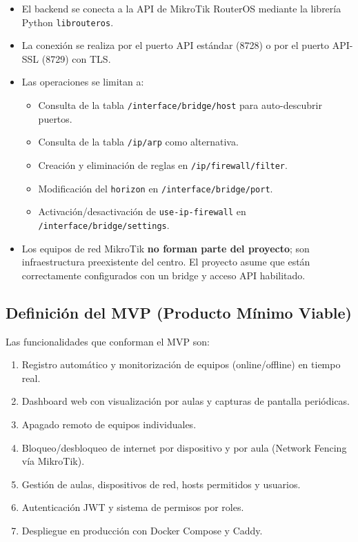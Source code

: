\documentclass[12pt, a4paper, twoside]{article}
\begin{document}
\begin{itemize}
  \item El backend se conecta a la API de MikroTik RouterOS mediante la librería Python \texttt{librouteros}.
  \item La conexión se realiza por el puerto API estándar (8728) o por el puerto API-SSL (8729) con TLS.
  \item Las operaciones se limitan a:
  \begin{itemize}
    \item Consulta de la tabla \texttt{/interface/bridge/host} para auto-descubrir puertos.
    \item Consulta de la tabla \texttt{/ip/arp} como alternativa.
    \item Creación y eliminación de reglas en \texttt{/ip/firewall/filter}.
    \item Modificación del \texttt{horizon} en \texttt{/interface/bridge/port}.
    \item Activación/desactivación de \texttt{use-ip-firewall} en \texttt{/interface/bridge/settings}.
  \end{itemize}
  \item Los equipos de red MikroTik \textbf{no forman parte del proyecto}; son infraestructura preexistente del centro. El proyecto asume que están correctamente configurados con un bridge y acceso API habilitado.
\end{itemize}

\subsection{Definición del MVP (Producto Mínimo Viable)}

Las funcionalidades que conforman el MVP son:

\begin{enumerate}
  \item Registro automático y monitorización de equipos (online/offline) en tiempo real.
  \item Dashboard web con visualización por aulas y capturas de pantalla periódicas.
  \item Apagado remoto de equipos individuales.
  \item Bloqueo/desbloqueo de internet por dispositivo y por aula (Network Fencing vía MikroTik).
  \item Gestión de aulas, dispositivos de red, hosts permitidos y usuarios.
  \item Autenticación JWT y sistema de permisos por roles.
  \item Despliegue en producción con Docker Compose y Caddy.
\end{enumerate}
\end{document}
